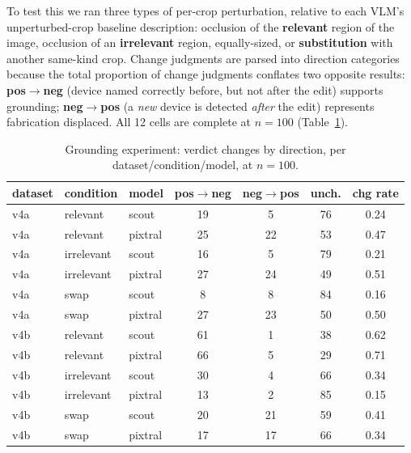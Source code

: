 \documentclass{ieeeaccess}
\begin{document}
To test this we ran three types of per-crop perturbation, relative to each VLM's unperturbed-crop baseline description: occlusion of the \textbf{relevant} region of the image, occlusion of an \textbf{irrelevant} region, equally-sized, or \textbf{substitution} with another same-kind crop. Change judgments are parsed into direction categories because the total proportion of change judgments conflates two opposite results: \textbf{pos$\rightarrow$neg} (device named correctly before, but not after the edit) supports grounding; \textbf{neg$\rightarrow$pos} (a \emph{new} device is detected \emph{after} the edit) represents fabrication displaced. All 12 cells are complete at $n = 100$ (Table~\ref{tab:grounding}).

\begin{table}[!t]
\caption{Grounding experiment: verdict changes by direction, per dataset/condition/model, at $n = 100$.}
\label{tab:grounding}
\centering
\footnotesize
\begin{tabular}{lllcccc}
\toprule
\textbf{dataset} & \textbf{condition} & \textbf{model} & \textbf{pos$\rightarrow$neg} & \textbf{neg$\rightarrow$pos} & \textbf{unch.} & \textbf{chg rate} \\
\midrule
v4a & relevant   & scout   & 19 & 5  & 76 & 0.24 \\
v4a & relevant   & pixtral & 25 & 22 & 53 & 0.47 \\
v4a & irrelevant & scout   & 16 & 5  & 79 & 0.21 \\
v4a & irrelevant & pixtral & 27 & 24 & 49 & 0.51 \\
v4a & swap       & scout   & 8  & 8  & 84 & 0.16 \\
v4a & swap       & pixtral & 27 & 23 & 50 & 0.50 \\
v4b & relevant   & scout   & 61 & 1  & 38 & 0.62 \\
v4b & relevant   & pixtral & 66 & 5  & 29 & 0.71 \\
v4b & irrelevant & scout   & 30 & 4  & 66 & 0.34 \\
v4b & irrelevant & pixtral & 13 & 2  & 85 & 0.15 \\
v4b & swap       & scout   & 20 & 21 & 59 & 0.41 \\
v4b & swap       & pixtral & 17 & 17 & 66 & 0.34 \\
\bottomrule
\end{tabular}
\end{table}
\end{document}
